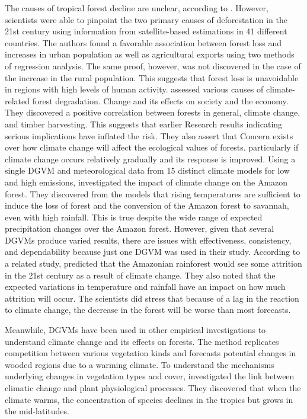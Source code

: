 The causes of tropical forest decline are unclear, according to \parencite{defries2010deforestation}. However, scientists were able to pinpoint the two primary causes of deforestation in the 21st century using information from satellite-based estimations in 41 different countries. The authors found a favorable association between forest loss and increases in urban population as well as agricultural exports using two methods of regression analysis. The same proof, however, was not discovered in the case of the increase in the rural
population. This suggests that forest loss is unavoidable in regions with high levels of human activity.
\parencite{sohngen1998comparison} assessed various causes of climate-related forest degradation.  Change and its effects on society and the economy. They discovered a positive correlation between forests in general, climate change, and timber harvesting. This suggests that earlier  Research results indicating serious implications have inflated the risk. They also assert that  Concern exists over how climate change will affect the ecological values of forests.  particularly if climate change occurs relatively gradually and its response is improved.
Using a single DGVM and meteorological data from 15 distinct climate models for low and high emissions, \parencite{malhi2008climate} investigated the impact of climate change on the Amazon forest. They discovered from the models that rising temperatures are sufficient to induce the loss of forest and the conversion of the Amazon forest to savannah, even with high rainfall. This is true despite the wide range of expected precipitation changes over the Amazon forest. However, given that several DGVMs produce varied results, there are issues with effectiveness, consistency, and dependability because just one DGVM was used in their study. According to a related study, \parencite{sitch2008evaluation} predicted that the Amazonian rainforest would see some attrition in the 21st century as a result of climate change. They also noted that the expected variations in temperature and rainfall have an impact on how much attrition will occur. The scientists did stress that because of a lag in the reaction to climate change, the decrease in the forest will be worse than most forecasts.

Meanwhile, DGVMs have been used in other empirical investigations to understand climate change and its effects on forests. The method replicates competition between various vegetation kinds and forecasts potential changes in wooded regions due to a warming climate. To understand the mechanisms underlying changes in vegetation types and cover, \parencite{kattge2011try} investigated the link between climatic change and plant physiological processes. They discovered that when the climate warms, the concentration of species declines in the tropics but grows in the mid-latitudes.

